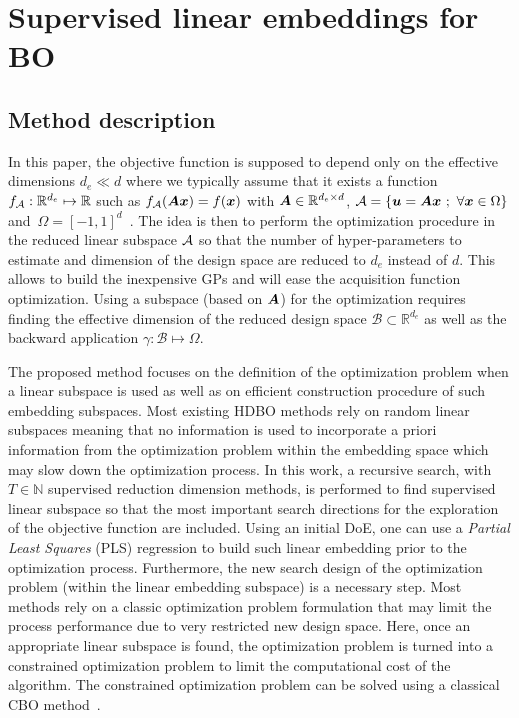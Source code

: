 \section{Supervised linear embeddings for BO}
\label{sec:EGFORSE}
\subsection{Method description}
\label{ssec:outline}

In this paper, the objective function is supposed to depend only on the effective dimensions 
$d_e \ll d$ where we typically assume that it exists a function $f_{{\mathcal{A}}}: \mathbb{R}^{d_e} \mapsto \mathbb{R}$ such as $f_{{\mathcal{A}}}(\bm{A}\bm{x}) = f(\bm{x})$ with $\bm{A} \in \mathbb{R}^{d_e \times d}$, ${\mathcal{A}} = \left\{ \bm{u} = \bm{A}\bm{x} \ ; \ \forall \bm{x} \in \Omega \right\}$ and\ $\Omega = [-1,1]^d$~\cite{WangBatchedHighdimensionalBayesian2018,binoisChoiceLowdimensionalDomain2020}.
The idea is then to perform the optimization procedure in the reduced linear subspace ${\mathcal{A}}$ so that the number of hyper-parameters to estimate and dimension of the design space are reduced to $d_e$ instead of  $d$.
This allows to build the inexpensive GPs and will ease the acquisition function optimization.
Using a subspace (based on $\bm{A}$) for the optimization requires finding the effective dimension of the reduced design space $\mathcal{B} \subset \mathbb{R}^{d_e}$ as well as the backward application $\gamma: \mathcal{B} \mapsto \Omega$.

The proposed method focuses on the definition of the optimization problem when a linear subspace is used as well as on efficient construction procedure of such embedding subspaces.  
Most existing HDBO methods rely on random linear subspaces  meaning that no information is used to incorporate a priori information from the optimization problem within the embedding space which may slow down the optimization process. 
In this work, a recursive search, with $T\in \mathbb{N}$ supervised reduction dimension methods, is performed to find supervised linear subspace so that the most important search directions for the exploration of the objective function are included. 
Using an initial DoE, one can use a \textit{Partial Least Squares} (PLS) regression \cite{hellandStructurePartialLeast1988} to build such linear embedding prior to the optimization process.
Furthermore, the new search design of the optimization problem (within the linear embedding subspace) is a necessary step.
Most methods rely on a classic optimization problem formulation that may limit the process performance due to very restricted new design space.
Here, once an appropriate linear subspace is found, the optimization problem is turned into a constrained optimization problem to limit the computational cost of the algorithm. The constrained optimization problem can be solved using a classical CBO method~\cite{frazierTutorialBayesianOptimization2018,priemOptimisationBayesienneSous2020,ShahriariTakingHumanOut2016,bartoliAdaptiveModelingStrategy2019,priemUpperTrustBound2020c}.

